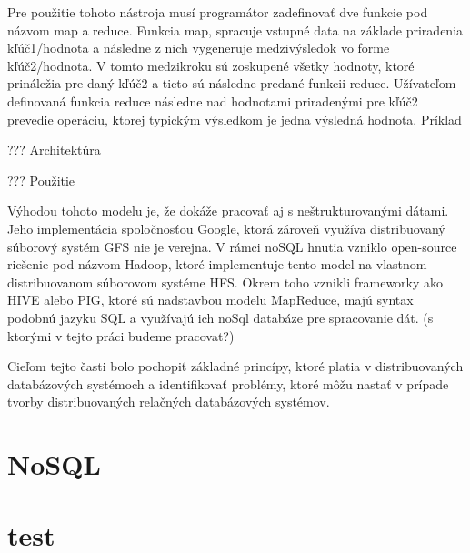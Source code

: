 \documentclass[11pt,twoside,a4paper]{book}
\begin{document}
Pre použitie tohoto nástroja musí programátor zadefinovať dve funkcie pod názvom map a reduce. Funkcia map, spracuje vstupné data na základe priradenia kľúč1/hodnota a následne z nich vygeneruje medzivýsledok vo forme kľúč2/hodnota. V tomto medzikroku sú zoskupené všetky hodnoty, ktoré prináležia pre daný kľúč2 a tieto sú následne predané funkcii reduce. Užívateľom definovaná funkcia reduce následne nad hodnotami priradenými pre kľúč2 prevedie operáciu, ktorej typickým výsledkom je jedna výsledná hodnota.
Príklad

???
Architektúra

???
Použitie

Výhodou tohoto modelu je, že dokáže pracovať aj s neštrukturovanými dátami. Jeho implementácia spoločnosťou Google, ktorá zároveň využíva distribuovaný súborový systém GFS nie je verejna. V rámci noSQL hnutia vzniklo open-source riešenie pod názvom Hadoop, ktoré implementuje tento model na vlastnom distribuovanom súborovom systéme HFS. Okrem toho vznikli frameworky ako HIVE alebo PIG, ktoré sú nadstavbou modelu MapReduce, majú syntax podobnú  jazyku SQL a využívajú ich noSql databáze pre spracovanie dát. (s ktorými v tejto práci budeme pracovat?)



\noindent Cieľom tejto časti bolo pochopiť základné princípy, ktoré platia v distribuovaných databázových systémoch a identifikovať problémy, ktoré môžu nastať v prípade tvorby distribuovaných relačných databázových systémov.


\chapter{NoSQL}

% 

% 



\chapter{test}
\end{document}
